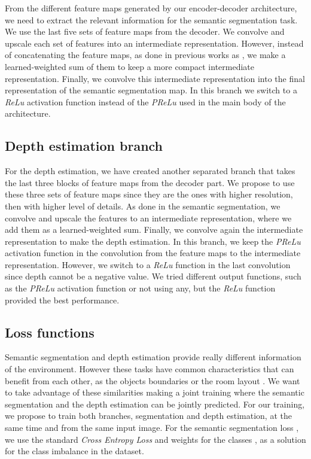 \documentclass[letterpaper, 10 pt, conference]{ieeeconf}
\begin{document}
From the different feature maps generated by our encoder-decoder architecture, we need to extract the relevant information for the semantic segmentation task. We use the last five sets of feature maps from the decoder. We convolve and upscale each set of features into an intermediate representation. However, instead of concatenating the feature maps, as done in previous works as \cite{dvornik2017blitznet}, we make a learned-weighted sum of them to keep a more compact intermediate representation. Finally, we convolve this intermediate representation into the final representation of the semantic segmentation map. In this branch we switch to a \textit{ReLu} activation function instead of the \textit{PReLu} used in the main body of the architecture. 

\subsection{Depth estimation branch}

For the depth estimation, we have created another separated branch that takes the last three blocks of feature maps from the decoder part. We propose to use these three sets of feature maps since they are the ones with higher resolution, then with higher level of details. As done in the semantic segmentation, we convolve and upscale the features to an intermediate representation, where we add them as a learned-weighted sum. Finally, we convolve again the intermediate representation to make the depth estimation. In this branch, we keep the \textit{PReLu} activation function in the convolution from the feature maps to the intermediate representation. However, we switch to a \textit{ReLu} function in the last convolution since depth cannot be a negative value. We tried different output functions, such as the \textit{PReLu} activation function or not using any, but the \textit{ReLu} function provided the best performance.

\subsection{Loss functions}

Semantic segmentation and depth estimation provide really different information of the environment. However these tasks have common characteristics that can benefit from each other, as the objects boundaries or the room layout \cite{zhang2018joint}. We want to take advantage of these similarities making a joint training where the semantic segmentation and the depth estimation can be jointly predicted.
For our training, we propose to train both branches, segmentation and depth estimation, at the same time and from the same input image. 
For the semantic segmentation loss  , we use the standard \textit{Cross Entropy Loss} and weights for the classes \cite{tian2022striking}, as a solution for the class imbalance in the dataset.
\end{document}
